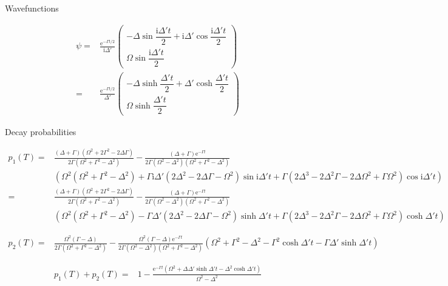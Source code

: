 \documentclass[10pt,fleqn]{article}
\newcommand{\ue}{\mathrm{e}}
\newcommand{\ui}{\mathrm{i}}
\newcommand{\eqar}[1]
{
  \begin{align*}
    #1
  \end{align*}
}
\newcommand{\paren}[1]{{\left({#1}\right)}}
\begin{document}
Wavefunctions
\eqar{
  \psi=&\frac{\ue^{-\Gamma t/2}}{\ui\Delta'}\begin{pmatrix}
    -\Delta\sin\dfrac{\ui\Delta't}{2}+\ui\Delta'\cos\dfrac{\ui\Delta't}{2}\\
    \Omega\sin\dfrac{\ui\Delta't}{2}
  \end{pmatrix}\\
  =&\frac{\ue^{-\Gamma t/2}}{\Delta'}\begin{pmatrix}
    -\Delta\sinh\dfrac{\Delta't}{2}+\Delta'\cosh\dfrac{\Delta't}{2}\\
    \Omega\sinh\dfrac{\Delta't}{2}
  \end{pmatrix}
}
Decay probabilities
\eqar{
  p_1(T)=&\frac{\paren{\Delta+\Gamma}\paren{\Omega^2+2\Gamma^2-2\Delta\Gamma}}{2\Gamma\paren{\Omega^2+\Gamma^2-\Delta^2}}-\frac{\paren{\Delta+\Gamma}\ue^{-\Gamma t}}{2\Gamma\paren{\Omega^2-\Delta^2}\paren{\Omega^2+\Gamma^2-\Delta^2}}\\
  &\paren{\Omega^2\paren{\Omega^2+\Gamma^2-\Delta^2}+\Gamma\ui\Delta'\paren{2\Delta^2-2\Delta\Gamma-\Omega^2}\sin\ui\Delta't+\Gamma\paren{2\Delta^3-2\Delta^2\Gamma-2\Delta\Omega^2+\Gamma\Omega^2}\cos\ui\Delta't}\\
  =&\frac{\paren{\Delta+\Gamma}\paren{\Omega^2+2\Gamma^2-2\Delta\Gamma}}{2\Gamma\paren{\Omega^2+\Gamma^2-\Delta^2}}-\frac{\paren{\Delta+\Gamma}\ue^{-\Gamma t}}{2\Gamma\paren{\Omega^2-\Delta^2}\paren{\Omega^2+\Gamma^2-\Delta^2}}\\
  &\paren{\Omega^2\paren{\Omega^2+\Gamma^2-\Delta^2}-\Gamma\Delta'\paren{2\Delta^2-2\Delta\Gamma-\Omega^2}\sinh\Delta't+\Gamma\paren{2\Delta^3-2\Delta^2\Gamma-2\Delta\Omega^2+\Gamma\Omega^2}\cosh\Delta't}
}
\eqar{
  p_2(T)=&\frac{\Omega^2\paren{\Gamma-\Delta}}{2\Gamma\paren{\Omega^2+\Gamma^2-\Delta^2}}-\frac{\Omega^2\paren{\Gamma-\Delta}\ue^{-\Gamma t}}{2\Gamma\paren{\Omega^2-\Delta^2}\paren{\Omega^2+\Gamma^2-\Delta^2}}\paren{\Omega^2+\Gamma^2-\Delta^2-\Gamma^2\cosh\Delta't-\Gamma\Delta'\sinh\Delta't}
}
\eqar{
  p_1(T)+p_2(T)=&1-\frac{\ue^{-\Gamma t}\paren{\Omega^2+\Delta\Delta'\sinh\Delta't-\Delta^2\cosh\Delta't}}{\Omega^2-\Delta^2}
}
\end{document}
